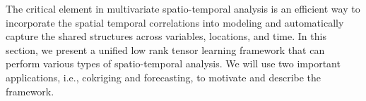 The critical element in multivariate spatio-temporal analysis is an efficient way to incorporate the spatial temporal correlations  into modeling and automatically capture the shared structures across variables, locations, and time. In this section, we present a unified low rank tensor learning framework that can perform various types of spatio-temporal analysis. We will use two important applications, i.e., cokriging and forecasting,  to motivate and describe the framework. %